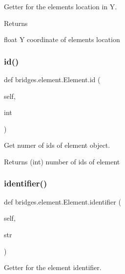 Getter for the element\textquotesingle{}s location in Y. 

\begin{DoxyReturn}{Returns}


float Y coordinate of element\textquotesingle{}s location 
\end{DoxyReturn}
\mbox{\label{classbridges_1_1element_1_1_element_aef2ce692ffbd43304790b594e6a6dc66}} 
\subsubsection{\texorpdfstring{id()}{id()}}
{\footnotesize\ttfamily def bridges.\+element.\+Element.\+id (\begin{DoxyParamCaption}\item[{}]{self,  }\item[{}]{int }\end{DoxyParamCaption})}



Get numer of ids of element object. 

\begin{DoxyReturn}{Returns}
(int) number of ids of element 
\end{DoxyReturn}
\mbox{\label{classbridges_1_1element_1_1_element_a8eb98e53169fc83f6adde36e1896cf2f}} 
\subsubsection{\texorpdfstring{identifier()}{identifier()}\hspace{0.1cm}{\footnotesize\ttfamily [1/2]}}
{\footnotesize\ttfamily def bridges.\+element.\+Element.\+identifier (\begin{DoxyParamCaption}\item[{}]{self,  }\item[{}]{str }\end{DoxyParamCaption})}



Getter for the element identifier. 

